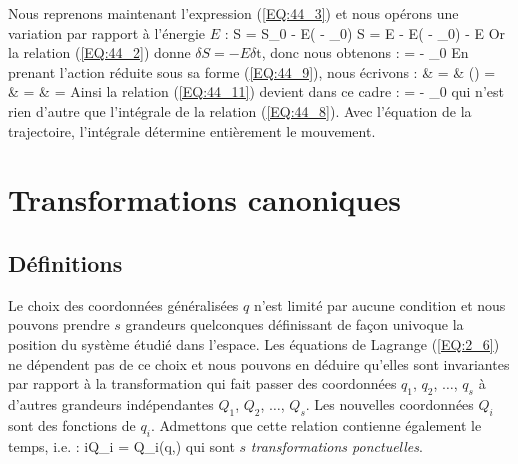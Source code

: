Nous reprenons maintenant l'expression (\ref{EQ:44_3}) et nous op\'{e}rons une variation par rapport \`{a} l'\'{e}nergie $E$ :
\benn
	S = S_{0} - E( - _{0}) \Rightarrow \delta S = \delta E - \delta E( - _{0}) - E\delta{}
\eenn
Or la relation (\ref{EQ:44_2}) donne $\delta S = -E\delta\mathrm{t}$, donc nous obtenons :
\be
	 =  - _{0} \label{EQ:44_11}
\ee
En prenant l'action r\'{e}duite sous sa forme (\ref{EQ:44_9}), nous \'{e}crivons :
\bea
	 & = & \left(\right) =  \nonumber \\
	& = &  =  \nonumber
\eea
Ainsi la relation (\ref{EQ:44_11}) devient dans ce cadre :
\be
	 =  - _{0} \label{EQ:44_12}
\ee
qui n'est rien d'autre que l'int\'{e}grale de la relation (\ref{EQ:44_8}). Avec l'\'{e}quation de la trajectoire, l'int\'{e}grale d\'{e}termine enti\`{e}rement le mouvement.

\section{Transformations canoniques}\label{PAR:45}

\subsection{D\'{e}finitions}

Le choix des coordonn\'{e}es g\'{e}n\'{e}ralis\'{e}es $q$ n'est limit\'{e} par aucune condition et nous pouvons prendre $s$ grandeurs quelconques d\'{e}finissant de fa\c{c}on univoque la position du syst\`{e}me \'{e}tudi\'{e} dans l'espace. Les \'{e}quations de Lagrange (\ref{EQ:2_6}) ne d\'{e}pendent pas de ce choix et nous pouvons en d\'{e}duire qu'elles sont invariantes par rapport \`{a} la transformation qui fait passer des coordonn\'{e}es $q_{1}$, $q_{2}$, $\ldots$, $q_{s}$ \`{a} d'autres grandeurs ind\'{e}pendantes $Q_{1}$, $Q_{2}$, $\ldots$, $Q_{s}$. Les nouvelles coordonn\'{e}es $Q_{i}$ sont des fonctions de $q_{i}$. Admettons que cette relation contienne \'{e}galement le temps, i.e. :
\be
	\forall i\text{, }Q_{i} = Q_{i}(q,) \label{EQ:45_1}
\ee
qui sont $s$ \emph{transformations ponctuelles}.

